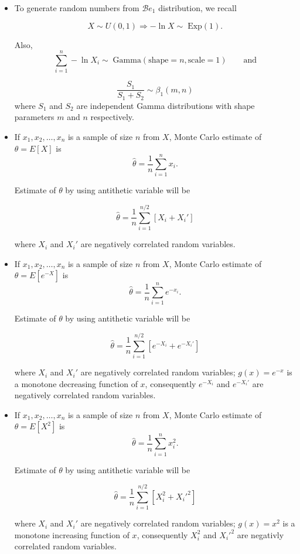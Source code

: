 \documentclass[11pt, a4paper]{article}\usepackage[]{graphicx}\usepackage[]{xcolor}
\begin{document}
\begin{itemize}

\item To generate random numbers from $\mathscr{B}e_1$ distribution, we recall

$$X \sim U(0, 1) \Rightarrow - \ln X \sim \; \text{Exp}(1).$$

Also, $$\sum \limits_{i = 1}^{n} - \ln X_i \sim \; \text{Gamma}(\text{shape} = n, \text{scale} = 1) \qquad \text{and}$$

$$\dfrac{S_1}{S_1 + S_2} \sim \beta_1(m, n)$$
where $S_1$ and $S_2$ are independent Gamma distributions with shape parameters $m$ and $n$ respectively.


\item If $x_1, x_2, \ldots, x_n$ is a sample of size $n$ from $X$, Monte Carlo estimate of $\theta = E[X]$ is $$\widehat{\theta} = \dfrac{1}{n} \sum \limits_{i = 1}^{n} x_i.$$

Estimate of $\theta$ by using antithetic variable will be

$$\widehat{\theta} = \dfrac{1}{n} \sum \limits_{i = 1}^{n/2} [X_i + X_i']$$

where $X_i$ and $X_i'$ are negatively correlated random variables.


\item If $x_1, x_2, \ldots, x_n$ is a sample of size $n$ from $X$, Monte Carlo estimate of $\theta = E[e^{-X}]$ is $$\widehat{\theta} = \dfrac{1}{n} \sum \limits_{i = 1}^{n} e^{-x_i}.$$

Estimate of $\theta$ by using antithetic variable will be

$$\widehat{\theta} = \dfrac{1}{n} \sum \limits_{i = 1}^{n/2} [e^{-X_i} + e^{-X_i'}]$$

where $X_i$ and $X_i'$ are negatively correlated random variables; $g(x) = e^{-x}$ is a monotone decreasing function of $x$, consequently $e^{-X_i}$ and $e^{-X_i'}$ are negatively correlated random variables.


\item If $x_1, x_2, \ldots, x_n$ is a sample of size $n$ from $X$, Monte Carlo estimate of $\theta = E[X^2]$ is $$\widehat{\theta} = \dfrac{1}{n} \sum \limits_{i = 1}^{n} x_i^2.$$

Estimate of $\theta$ by using antithetic variable will be

$$\widehat{\theta} = \dfrac{1}{n} \sum \limits_{i = 1}^{n/2} [X_i^2 + X_i'^2]$$

where $X_i$ and $X_i'$ are negatively correlated random variables; $g(x) = x^2$ is a monotone increasing function of $x$, consequently $X_i^2$ and $X_i'^2$ are negativly correlated random variables.


\end{itemize}
\end{document}
